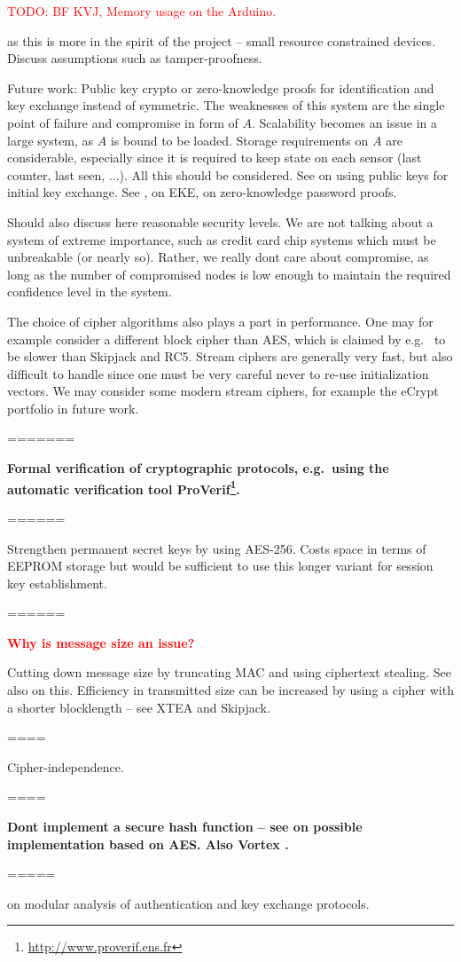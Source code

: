 \textcolor{red}{TODO: BF KVJ, Memory usage on the Arduino.} 



as this is more in the spirit of the project -- small resource constrained devices. Discuss assumptions such as tamper-proofness.

Future work: Public key crypto or zero-knowledge proofs for identification and key exchange instead of symmetric. The weaknesses of this system are the single point of failure and compromise in form of $A$. Scalability becomes an issue in a large system, as $A$ is bound to be loaded. Storage requirements on $A$ are considerable, especially since it is required to keep state on each sensor (last counter, last seen, ...). All this should be considered. See \cite{rfc-4556-2006} on using public keys for initial key exchange.
See \cite{bellovin1992}, \cite{bellovin1993} on EKE, \cite{wu1997} on zero-knowledge password proofs. 

Should also discuss here reasonable security levels. We are not talking about a system of extreme importance, such as credit card chip systems which must be unbreakable (or nearly so). Rather, we really dont care about compromise, as long as the number of compromised nodes is low enough to maintain the required confidence level in the system.

The choice of cipher algorithms also plays a part in performance. One may for example consider a different block cipher than AES, which is claimed by e.g.\  to be slower than Skipjack and RC5. Stream ciphers are generally very fast, but also difficult to handle since one must be very careful never to re-use initialization vectors. We may consider some modern stream ciphers, for example the eCrypt portfolio in future work.


=======

\textbf{Formal verification of cryptographic protocols, e.g.\ using the automatic verification tool ProVerif\footnote{\url{http://www.proverif.ens.fr}}.}


======

Strengthen permanent secret keys by using AES-256. Costs space in terms of EEPROM storage but would be sufficient to use this longer variant for session key establishment.

======

\textcolor{red}{\bf Why is message size an issue?}

Cutting down message size by truncating MAC and using ciphertext stealing. See also \cite{karlof2004} on this.
Efficiency in transmitted size can be increased by using a cipher with a shorter blocklength -- see XTEA and Skipjack.

====

Cipher-independence.

====

\textbf{Dont implement a secure hash function -- see \cite{cohen2001} on possible implementation based on AES. Also Vortex \cite{gueron2008}.}


=====

\cite{bellare1998a} on modular analysis of authentication and key exchange protocols.